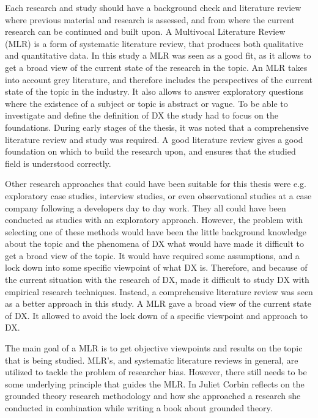 \documentclass[english, 12pt, a4paper, sci, utf8, a-1b, online]{aaltothesis}
\begin{document}
Each research and study should have a background check and literature review where previous material and research is assessed, and from where the current research can be continued and built upon. A Multivocal Literature Review (MLR) is a form of systematic literature review, that produces both qualitative and quantitative data. In this study a MLR was seen as a good fit, as it allows to get a broad view of the current state of the research in the topic. An MLR takes into account grey literature, and therefore includes the perspectives of the current state of the topic in the industry. It also allows to answer exploratory questions where the existence of a subject or topic is abstract or vague. To be able to investigate and define the definition of DX the study had to focus on the foundations. During early stages of the thesis, it was noted that a comprehensive literature review and study was required. A good literature review gives a good foundation on which to build the research upon, and ensures that the studied field is understood correctly.

Other research approaches that could have been suitable for this thesis were e.g. exploratory case studies, interview studies, or even observational studies at a case company following a developers day to day work. They all could have been conducted as studies with an exploratory approach. However, the problem with selecting one of these methods would have been the little background knowledge about the topic and the phenomena of DX what would have made it difficult to get a broad view of the topic. It would have required  some assumptions, and a lock down into some specific viewpoint of what DX is. Therefore, and because of the current situation with the research of DX, made it difficult to study DX with empirical research techniques. Instead, a comprehensive literature review was seen as a better approach in this study. A MLR gave a broad view of the current state of DX. It allowed to avoid the lock down of a specific viewpoint and approach to DX.

The main goal of a MLR is to get objective viewpoints and results on the topic that is being studied. MLR's, and systematic literature reviews in general, are utilized to tackle the problem of researcher bias.  However, there still needs to be some underlying principle that guides the MLR. In \textcite{developing-grounded-theory} Juliet Corbin reflects on the grounded theory research methodology and how she approached a research she conducted in combination while writing a book \parencite{basics-of-qualitative-research} about grounded theory.
\end{document}

